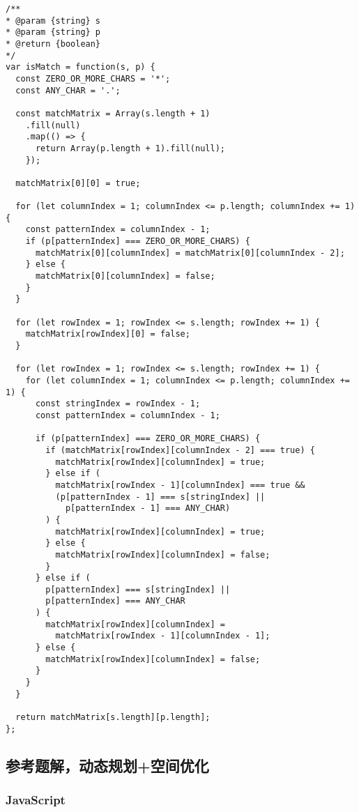 \begin{verbatim}
/**
* @param {string} s
* @param {string} p
* @return {boolean}
*/
var isMatch = function(s, p) {
  const ZERO_OR_MORE_CHARS = '*';
  const ANY_CHAR = '.';

  const matchMatrix = Array(s.length + 1)
    .fill(null)
    .map(() => {
      return Array(p.length + 1).fill(null);
    });

  matchMatrix[0][0] = true;

  for (let columnIndex = 1; columnIndex <= p.length; columnIndex += 1) {
    const patternIndex = columnIndex - 1;
    if (p[patternIndex] === ZERO_OR_MORE_CHARS) {
      matchMatrix[0][columnIndex] = matchMatrix[0][columnIndex - 2];
    } else {
      matchMatrix[0][columnIndex] = false;
    }
  }

  for (let rowIndex = 1; rowIndex <= s.length; rowIndex += 1) {
    matchMatrix[rowIndex][0] = false;
  }

  for (let rowIndex = 1; rowIndex <= s.length; rowIndex += 1) {
    for (let columnIndex = 1; columnIndex <= p.length; columnIndex += 1) {
      const stringIndex = rowIndex - 1;
      const patternIndex = columnIndex - 1;

      if (p[patternIndex] === ZERO_OR_MORE_CHARS) {
        if (matchMatrix[rowIndex][columnIndex - 2] === true) {
          matchMatrix[rowIndex][columnIndex] = true;
        } else if (
          matchMatrix[rowIndex - 1][columnIndex] === true &&
          (p[patternIndex - 1] === s[stringIndex] ||
            p[patternIndex - 1] === ANY_CHAR)
        ) {
          matchMatrix[rowIndex][columnIndex] = true;
        } else {
          matchMatrix[rowIndex][columnIndex] = false;
        }
      } else if (
        p[patternIndex] === s[stringIndex] ||
        p[patternIndex] === ANY_CHAR
      ) {
        matchMatrix[rowIndex][columnIndex] =
          matchMatrix[rowIndex - 1][columnIndex - 1];
      } else {
        matchMatrix[rowIndex][columnIndex] = false;
      }
    }
  }

  return matchMatrix[s.length][p.length];
};
\end{verbatim}

\subsection{参考题解，动态规划+空间优化}

\subsubsection{JavaScript}

